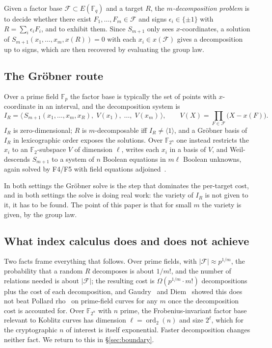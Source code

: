 \documentclass[10pt,a4paper]{article}
\theoremstyle{remark}
\newcommand{\FF}{\mathbb{F}}
\newcommand{\Fb}{\mathcal{F}}
\newcommand{\Sem}[1]{S_{#1}}
\newcommand{\abs}[1]{\lvert #1 \rvert}
\begin{document}
Given a factor base $\Fb \subset E(\FF_q)$ and a target $R$, the
\emph{$m$-decomposition problem} is to decide whether there exist
$F_1,\ldots,F_m \in \Fb$ and signs $\epsilon_i \in \{\pm 1\}$ with
$R = \sum_i \epsilon_i F_i$, and to exhibit them. Since $\Sem{m+1}$ only
sees $x$-coordinates, a solution of
$\Sem{m+1}(x_1,\ldots,x_m,x(R)) = 0$ with each $x_i \in x(\Fb)$ gives a
decomposition up to signs, which are then recovered by evaluating the
group law.

\subsection{The Gr\"obner route}

Over a prime field $\FF_p$ the factor base is typically the set of points
with $x$-coordinate in an interval, and the decomposition system is
\begin{equation}
\label{eq:ideal}
  I_R = \big\langle\, \Sem{m+1}(x_1,\ldots,x_m,x_R),\;
        V(x_1),\;\ldots,\;V(x_m) \,\big\rangle,
  \qquad V(X) = \prod_{F \in \Fb}\big(X - x(F)\big).
\end{equation}
$I_R$ is zero-dimensional; $R$ is $m$-decomposable iff $I_R \neq
\langle 1 \rangle$, and a Gr\"obner basis of $I_R$ in lexicographic
order exposes the solutions. Over $\FF_{2^n}$ one instead restricts the
$x_i$ to an $\FF_2$-subspace $V$ of dimension $\ell$, writes each $x_i$
in a basis of $V$, and Weil-descends $\Sem{m+1}$ to a system of $n$
Boolean equations in $m\ell$ Boolean unknowns, again solved by F4/F5
with field equations adjoined~\cite{fppr2012,petitquisquater2012}.

In both settings the Gr\"obner solve is the step that dominates the
per-target cost, and in both settings the solve is doing real work: the
variety of $I_R$ is not given to it, it has to be found. The point of
this paper is that for small $m$ the variety is given, by the group law.

\subsection{What index calculus does and does not achieve}

Two facts frame everything that follows. Over prime fields, with
$\abs{\Fb} \approx p^{1/m}$, the probability that a random $R$
decomposes is about $1/m!$, and the number of relations needed is about
$\abs{\Fb}$; the resulting cost is $\Omega(p^{1/m} \cdot m!)$ decompositions
plus the cost of each decomposition, and Gaudry~\cite{gaudry2009} and
Diem~\cite{diem2011} showed this does not beat Pollard
rho~\cite{pollard1978} on prime-field curves for any $m$ once the
decomposition cost is accounted for. Over $\FF_{2^n}$ with $n$ prime,
the Frobenius-invariant factor base relevant to Koblitz curves has
dimension $\ell = \operatorname{ord}_2(n)$ and size $2^\ell$, which for
the cryptographic $n$ of interest is itself exponential. Faster
decomposition changes neither fact. We return to this in
\S\ref{sec:boundary}.
\end{document}

